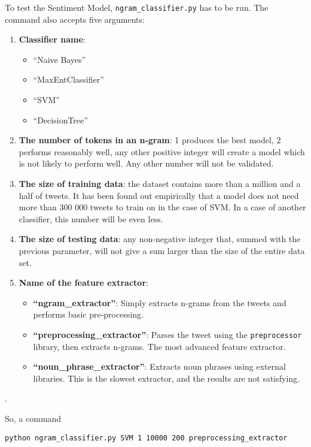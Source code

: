 \par To test the Sentiment Model, \texttt{ngram\_classifier.py} has to be run. The command also accepts five arguments: 
\begin{enumerate}
    \item \textbf{Classifier name}: 
    \begin{itemize}
    \item ``Naive Bayes''
    \item ``MaxEntClassifier''
    \item ``SVM''
    \item ``DecisionTree''
  \end{itemize}
    \item \textbf{The number of tokens in an n-gram}: 1 produces the best model, 2 performs reasonably well, any other positive integer will create a model which is not likely to perform well. Any other number will not be validated.
    \item \textbf{The size of training data}: the dataset contains more than a million and a half of tweets. It has been found out empirically that a model does not need more than 300 000 tweets to train on in the case of SVM. In a case of another classifier, this number will be even less. 
    \item \textbf{The size of testing data}: any non-negative integer that, summed with the previous parameter, will not give a sum larger than the size of the entire data set.
    \item \textbf{Name of the feature extractor}:
    \begin{itemize}
    \item \textbf{``ngram\_extractor''}: Simply extracts n-grams from the tweets and performs basic pre-processing.
    \item \textbf{``preprocessing\_extractor''}: Parses the tweet using the \texttt{preprocessor} library, then extracts n-grams. The most advanced feature extractor. 
    \item \textbf{``noun\_phrase\_extractor''}: Extracts noun phrases using external libraries. This is the slowest extractor, and the results are not satisfying.
  \end{itemize}
\end{enumerate}.

So, a command
\begin{center}
\texttt{python ngram\_classifier.py SVM 1 10000 200 preprocessing\_extractor}
\end{center}

